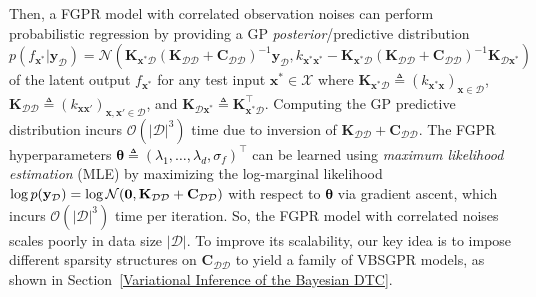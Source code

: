 \documentclass[conference]{IEEEtran}
\begin{document}
Then, a FGPR model with correlated observation noises 
can perform probabilistic regression by providing a GP \emph{posterior}/predictive distribution $p(f_{\mathbf{x}^*} | \mathbf{y}_\mathcal{D}) = \mathcal{N}(\mathbf{K}_{\mathbf{x}^*\mathcal{D}}(\mathbf{K}_{\mathcal{D}\mathcal{D}} + \mathbf{C}_{\mathcal{D}\mathcal{D}})^{-1}\mathbf{y}_\mathcal{D}, k_{\mathbf{x}^*\mathbf{x}^*} - \mathbf{K}_{\mathbf{x}^*\mathcal{D}}(\mathbf{K}_{\mathcal{D}\mathcal{D}} + \mathbf{C}_{\mathcal{D}\mathcal{D}})^{-1}\mathbf{K}_{\mathcal{D}\mathbf{x}^*})$ of the latent output $f_{\mathbf{x}^*}$ for any test input $\mathbf{x}^*\in\mathcal{X}$ where $\mathbf{K}_{\mathbf{x}^*\mathcal{D}} \triangleq (k_{\mathbf{x}^*\mathbf{x}})_{\mathbf{x}\in \mathcal{D}}$, $\mathbf{K}_\mathcal{DD} \triangleq (k_{\mathbf{x}\mathbf{x}'})_{\mathbf{x},\mathbf{x}' \in \mathcal{D}}$, and $\mathbf{K}_{\mathcal{D}\mathbf{x}^*} \triangleq \mathbf{K}^\top_{\mathbf{x}^*\mathcal{D}}$.
Computing the GP predictive distribution incurs $\mathcal{O}(|\mathcal{D}|^3)$ time due to inversion of $\mathbf{K}_\mathcal{DD} + \mathbf{C}_{\mathcal{D}\mathcal{D}}$. 
The FGPR hyperparameters \textcolor{black}{$\boldsymbol{\theta}\triangleq (\lambda_1,\ldots,\lambda_d, \sigma_f)^\top$} 
can be learned using \emph{maximum likelihood estimation} (MLE) by maximizing the log-marginal likelihood $\log p(\mathbf{y}_\mathcal{D}) = \log \mathcal{N}(\mathbf{0}, \mathbf{K}_\mathcal{DD}\hspace{-0mm} +\hspace{-0mm}  \mathbf{C}_{\mathcal{D}\mathcal{D}})$ with respect to \textcolor{black}{$\boldsymbol{\theta}$} 
via gradient ascent, which incurs $\mathcal{O}(|\mathcal{D}|^3)$ time per iteration. 	
So, the FGPR model with correlated noises scales poorly in data size $|\mathcal{D}|$. 
To improve its scalability, our key idea is to impose different sparsity structures on $\mathbf{C}_{\mathcal{D}\mathcal{D}}$ to yield a family of VBSGPR models, as shown  in Section~\ref{Variational Inference of the Bayesian DTC}.%
\end{document}
